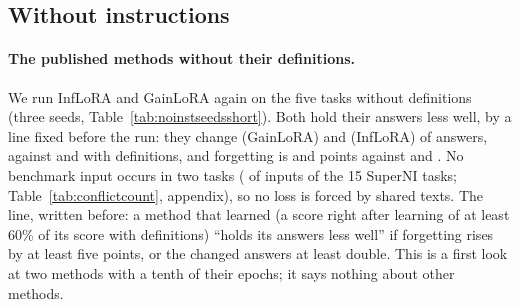 \subsection{Without instructions}
\label{sec:noinst}

\paragraph{The published methods without their definitions.} We run InfLoRA and GainLoRA again on the
five tasks without definitions (three seeds, Table~\ref{tab:noinstseedsshort}). Both hold their answers
less well, by a line fixed before the run: they change \AudSeedsGainloraChanged{} (GainLoRA) and
\AudSeedsInfloraChanged{} (InfLoRA) of \AudSeedsCompared{} answers, against \FiveGainChanged{} and
\FiveInfChanged{} with definitions, and forgetting is \AudSeedsGainloraFT{} and \AudSeedsInfloraFT{}
points against \FiveGainFT{} and \FiveInfFT{}. No benchmark input occurs in two tasks
(\AudConfOneShared{} of \AudConfOneInputs{} inputs of the 15 SuperNI tasks; Table~\ref{tab:conflictcount},
appendix), so no loss is forced by shared texts. The line, written before: a method that
learned (a score right after learning of at least 60\% of its score with definitions) ``holds its
answers less well'' if forgetting rises by at least five points, or the changed answers at least double.
This is a first look at two methods with a tenth of their epochs; it says nothing about other methods.

\begin{table}[t]
  \caption{The five tasks without definitions, T5-base, 10 epochs, means over \AudSeedsN{} seeds (changed answers summed), re-test (all references). Answers changed: answers to test inputs of the first four tasks that differ at the end. The 100-epoch rows are one seed.}
  \label{tab:noinstseedsshort}
  \centering
  
\end{table}

